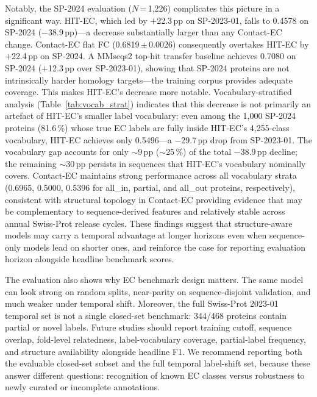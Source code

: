 \documentclass[numbered,contemporary,mediumone]{oup-authoring-template}
\begin{document}
Notably, the SP-2024 evaluation ($N$\,=\,1{,}226) complicates this picture in a
significant way. HIT-EC, which led by $+$22.3\,pp on SP-2023-01, falls to 0.4578
on SP-2024 ($-$38.9\,pp)---a decrease substantially larger than any Contact-EC
change. Contact-EC flat FC (0.6819\,$\pm$\,0.0026) consequently overtakes HIT-EC
by $+$22.4\,pp on SP-2024. A MMseqs2 top-hit transfer baseline achieves 0.7080 on SP-2024
($+$12.3\,pp over SP-2023-01), showing that SP-2024 proteins are not
intrinsically harder homology targets---the training corpus provides
adequate coverage. This makes HIT-EC's decrease more notable.
Vocabulary-stratified analysis (Table~\ref{tab:vocab_strat})
indicates that this decrease is not primarily an artefact of HIT-EC's smaller label
vocabulary: even among the 1{,}000 SP-2024 proteins (81.6\,\%) whose true EC labels
are fully inside HIT-EC's 4{,}255-class vocabulary, HIT-EC achieves only
0.5496---a $-$29.7\,pp drop from SP-2023-01. The vocabulary gap accounts
for only $\sim$9\,pp ($\sim$25\,\%) of the total $-$38.9\,pp decline; the
remaining $\sim$30\,pp persists in sequences that HIT-EC's vocabulary nominally covers.
Contact-EC maintains
strong performance across all vocabulary strata (0.6965, 0.5000, 0.5396 for
all\_in, partial, and all\_out proteins, respectively), consistent with structural
topology in Contact-EC providing evidence that may be complementary to sequence-derived features
and relatively stable across annual Swiss-Prot release cycles. These findings
suggest that structure-aware models may carry a temporal advantage at longer horizons
even when sequence-only models lead on shorter ones, and reinforce the case for
reporting evaluation horizon alongside headline benchmark scores.

The evaluation also shows why EC benchmark design matters. The same model can look
strong on random splits, near-parity on sequence-disjoint validation, and much
weaker under temporal shift. Moreover, the full Swiss-Prot 2023-01 temporal set is
not a single closed-set benchmark: 344/468 proteins contain partial or novel labels.
Future studies should report training cutoff, sequence overlap, fold-level
relatedness, label-vocabulary coverage, partial-label frequency, and structure availability alongside headline F1.
We recommend reporting both the evaluable closed-set subset and the full temporal
label-shift set, because these answer different questions: recognition of known EC
classes versus robustness to newly curated or incomplete annotations.
\end{document}
